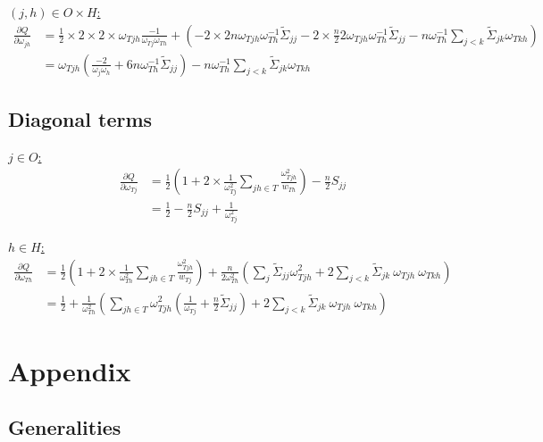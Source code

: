\documentclass[11pt,a4paper]{article}
\begin{document}
\underline{$(j,h)\in O\times H$:}
\begin{align*}
\frac{\partial Q}{\partial \omega_{jh}}  &=\frac{1}{2}\times 2\times 2\times\omega_{Tjh} \frac{-1}{\omega_{Tj}\omega_{Th}} +\left( -2\times 2n\omega_{Tjh}\omega_{Th}^{-1} \tilde{\Sigma}_{jj} - 2\times \frac{n}{2}2\omega_{Tjh} \omega_{Th}^{-1}\tilde{\Sigma}_{jj} -n\omega_{Th}^{-1}\sum_{j < k} \tilde{\Sigma}_{jk}\omega_{Tkh} \right)\\
&=\omega_{Tjh}\left(\frac{-2}{\omega_{j}\omega_{h}} + 6n \omega_{Th}^{-1} \tilde{\Sigma}_{jj} \right) -n\omega_{Th}^{-1}\sum_{j < k} \tilde{\Sigma}_{jk}\omega_{Tkh} 
\end{align*}

\subsection{Diagonal terms}
\underline{$j\in O $:}
\begin{align*}
\frac{\partial Q}{\partial \omega_{Tj}}  &= \frac{1}{2}\left(1+2\times \frac{1}{\omega_{Tj}^2}\sum_{jh\in T} \frac{\omega_{Tjh}^2}{w_{Th}}\right) -\frac{n}{2}S_{jj}\\
&=\frac{1}{2} - \frac{n}{2} S_{jj} + \frac{1}{\omega_{Tj}^2}
\end{align*}
\vspace{1cm}


\underline{$h\in H$:}
\begin{align*}
\frac{\partial Q}{\partial \omega_{Th}}  &= \frac{1}{2}\left(1+2\times \frac{1}{\omega_{Th}^2}\sum_{jh\in T} \frac{\omega_{Tjh}^2}{w_{Tj}}\right) + \frac{n}{2\omega_{Th}^2} \left( \sum_j \tilde{\Sigma}_{jj} \omega_{Tjh}^2 +2\sum_{j < k} \tilde{\Sigma}_{jk} \: \omega_{Tjh} \: \omega_{Tkh}\right)\\
&= \frac{1}{2} + \frac{1}{\omega_{Th}^2}\left(\sum_{jh\in T}\omega_{Tjh}^2 \left(\frac{1}{\omega_{Tj}} + \frac{n}{2}\tilde{\Sigma}_{jj}\right)+2\sum_{j < k} \tilde{\Sigma}_{jk} \: \omega_{Tjh} \: \omega_{Tkh}\right)
\end{align*}

\newpage
\section{Appendix}

\subsection{Generalities}
\end{document}
